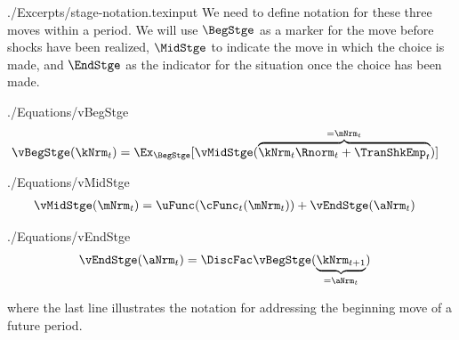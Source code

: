 \documentclass[titlepage, headings=optiontotocandhead]{\econtex}
\providecommand{\stge}{t}\renewcommand{\stge}{t}
\providecommand{\interval}{period}\renewcommand{\interval}{period}
\providecommand{\move}{move}\renewcommand{\move}{move}
\providecommand{\moves}{moves}\renewcommand{\moves}{moves}
\providecommand{\interval}{period}\renewcommand{\interval}{period}
\begin{document}
\begin{verbatimwrite}{./Excerpts/stage-notation.texinput}
  We need to define notation for these three {\moves} within a {\interval}. We will use $\BegStge$ as a marker for the {\move} before shocks have been realized, $\MidStge$ to indicate the move in which the choice is made, and $\EndStge$ as the indicator for the situation once the choice has been made.
\end{verbatimwrite}

\begin{verbatimwrite}{./Equations/vBegStge}
  \begin{equation}\begin{gathered}\begin{aligned}
\vBegStge(\kNrm_{\stge}) & = \Ex_{\BegStge}[\vMidStge(\overbrace{\kNrm_{\stge} \Rnorm_{\stge} + \TranShkEmp_{\stge}}^{=\mNrm_{\stge}})]  \label{eq:vBegStge}
      \end{aligned}\end{gathered}\end{equation}
\end{verbatimwrite}
\unskip
\begin{verbatimwrite}{./Equations/vMidStge}
  \begin{equation}\begin{gathered}\begin{aligned}
\vMidStge(\mNrm_{\stge}) & = \uFunc(\cFunc_{\stge}(\mNrm_{\stge})) + \vEndStge(\aNrm_{\stge}) \label{eq:vMidStge}
      \end{aligned}\end{gathered}\end{equation}
\end{verbatimwrite}
\unskip
\begin{verbatimwrite}{./Equations/vEndStge}
  \begin{equation}\begin{gathered}\begin{aligned}
\vEndStge(\aNrm_{\stge}) & = \DiscFac \vBegStge(\underbrace{\kNrm_{\stge+1}}_{=\aNrm_{\stge}}) \label{eq:vEndStge}
      \end{aligned}\end{gathered}\end{equation}
\end{verbatimwrite}
\unskip
where the last line illustrates the notation for addressing the beginning {\move} of a future {\interval}.

\end{document}
